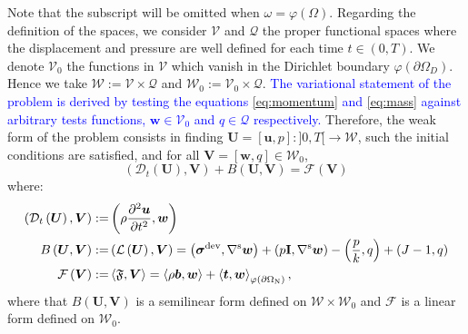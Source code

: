 \documentclass[11pt,english]{article}
\newcommand{\LM}[1]{\textcolor{blue}{#1}}
\def\InitialDomain{\Omega}
\def\DeformedDomain{\varphi(\InitialDomain)}
\def\disp{\boldsymbol{u}}
\def\disptest{\boldsymbol{w}}
\def\stress{\boldsymbol{\sigma}}
\def\Identity{\mathbf{I}}
\def\SpaceDisp{\boldsymbol{\mathcal{V}}}
\def\SpacePress{\mathcal{Q}}
\def\SpaceTotal{\boldsymbol{\mathcal{W}}}
\def\TestFunctions{\boldsymbol{V}}
\def\UnkVariables{\boldsymbol{U}}
\def\t{\boldsymbol{t}}
\begin{document}
    Note that the subscript will be omitted when $\omega=\DeformedDomain$. Regarding the definition of the spaces, we consider $\SpaceDisp$ and $\SpacePress$ the proper functional spaces where the displacement and pressure are well defined for each time $t \in \left(0,T\right)$.  We denote $\SpaceDisp_0$ the functions in $\SpaceDisp$ which vanish in the Dirichlet boundary $\varphi(\partial\Omega_D)$. Hence we take $\SpaceTotal:=\SpaceDisp\times\SpacePress$ and $\SpaceTotal_0:=\SpaceDisp_0\times\SpacePress$. 
    \LM{The variational statement of the problem is derived by testing the equations \eqref{eq:momentum} and \eqref{eq:mass} against arbitrary tests functions, $\disptest \in \SpaceDisp_0$ and $q \in \SpacePress$ respectively.}
    Therefore, the weak form of the problem consists in finding $\UnkVariables=[\disp,p]:]0,T[\longrightarrow\SpaceTotal$, such the initial conditions are satisfied, and for all $\TestFunctions=[\boldsymbol{w},q] \in \SpaceTotal_0$,
    \begin{equation}
        \left(\mathcal{D}_t\left(\UnkVariables\right),\TestFunctions \right)+ B\left(\UnkVariables,\TestFunctions\right)= \mathcal{F}\left(\TestFunctions\right)   \label{eq:variational_in_compact_form}
    \end{equation}
where:
    \begin{align}
        \left(\mathcal{D}_t\left(\UnkVariables\right),\TestFunctions \right) := & \left(\rho\dfrac{\partial^2\disp}{\partial t^2},\disptest\right)\\
        B\left(\UnkVariables,\TestFunctions\right) := &\left(\mathcal{L}\left(\UnkVariables\right),\TestFunctions \right)= \left( \stress^{\rm{dev}}, \nabla^{\rm{s}} \disptest\right) + \left(  p \Identity, \nabla^{\rm{s}} \disptest\right) -\left( \dfrac{p}{k}, q\right) + \left(J-1, q\right) \label{eq:bilinear_form}\\
        \mathcal{F}\left(\TestFunctions\right) := & \left\langle\mathfrak{F},\TestFunctions\right\rangle=\left\langle \rho \boldsymbol{b},\disptest \right\rangle + \left\langle \t,\disptest \right\rangle_{\varphi(\partial\Omega_{\rm{N}})},
    \end{align}
    where that $B\left(\UnkVariables,\TestFunctions\right)$ is a semilinear form defined on $\SpaceTotal\times\SpaceTotal_0$ and $\mathcal{F}$ is a linear form defined on $\SpaceTotal_0$.
    
\end{document}
